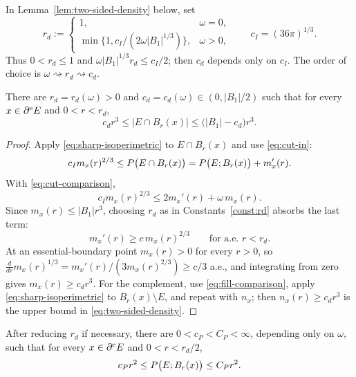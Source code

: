 \begin{constants}\label{const:rd}
In Lemma~\ref{lem:two-sided-density} below, set
\[
 r_d:=
 \begin{cases}
  1,&\omega=0,\\
  \min\{1,c_I/(2\omega|B_1|^{1/3})\},&\omega>0,
 \end{cases}
 \qquad c_I=(36\pi)^{1/3}.
\]
Thus $0<r_d\le1$ and
$\omega|B_1|^{1/3}r_d\le c_I/2$; then $c_d$ depends only on $c_I$.
The order of choice is
$\omega\rightsquigarrow r_d\rightsquigarrow c_d$.
\end{constants}

\begin{lemma}\label{lem:two-sided-density}
There are $r_d=r_d(\omega)>0$ and $c_d=c_d(\omega)\in(0,|B_1|/2)$ such that
for every $x\in\partial^{\mathrm e} E$ and $0<r<r_d$,
\begin{equation}\label{eq:two-sided-density}
  c_dr^3\le|E\cap B_r(x)|\le\bigl(|B_1|-c_d\bigr)r^3 .
\end{equation}
\end{lemma}

\begin{proof}
Apply \eqref{eq:sharp-isoperimetric} to $E\cap B_r(x)$ and use
\eqref{eq:cut-in}:
\[
  c_Im_x(r)^{2/3}\le P\bigl(E\cap B_r(x)\bigr)
  =P\bigl(E;B_r(x)\bigr)+m_x'(r) .
\]
With \eqref{eq:cut-comparison},
\begin{equation}\label{eq:density-ode}
  c_Im_x(r)^{2/3}\le2m_x'(r)+\omega\,m_x(r).
\end{equation}
Since $m_x(r)\le|B_1|r^3$, choosing $r_d$ as in
Constants~\ref{const:rd} absorbs the last term:
\begin{equation}\label{eq:density-ode-clean}
  m_x'(r)\ge c\,m_x(r)^{2/3}\qquad\text{for a.e.\ }r<r_d .
\end{equation}
At an essential-boundary point $m_x(r)>0$ for every $r>0$, so
$\tfrac{d}{dr}m_x(r)^{1/3}=m_x'(r)/(3m_x(r)^{2/3})\ge c/3$ a.e., and
integrating from zero gives $m_x(r)\ge c_dr^3$.  For the complement, use
\eqref{eq:fill-comparison}, apply \eqref{eq:sharp-isoperimetric} to
$B_r(x)\setminus E$, and repeat with $n_x$; then
$n_x(r)\ge c_dr^3$ is the upper bound in \eqref{eq:two-sided-density}.
\end{proof}

\begin{lemma}\label{lem:ahlfors}
After reducing $r_d$ if necessary, there are
$0<c_P<C_P<\infty$, depending only on $\omega$, such that for every
$x\in\partial^{\mathrm e} E$ and $0<r<r_d/2$,
\begin{equation}\label{eq:ahlfors}
  c_Pr^2\le P\bigl(E;B_r(x)\bigr)\le C_Pr^2 .
\end{equation}
\end{lemma}

